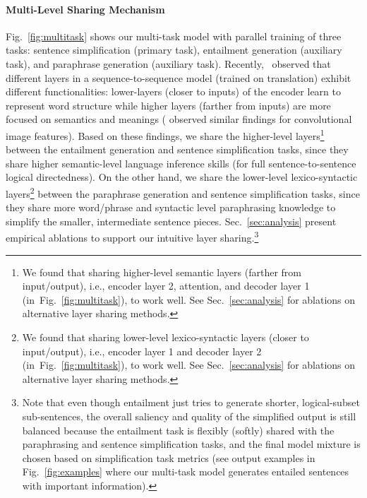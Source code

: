 \documentclass[11pt]{article}
\def\figref#1{Fig.~\ref{#1}}
\begin{document}
\paragraph{Multi-Level Sharing Mechanism} Fig.~\ref{fig:multitask} shows our multi-task model with parallel training of three tasks: sentence simplification (primary task), entailment generation (auxiliary task), and paraphrase generation (auxiliary task). 
Recently,~ observed that different layers in a sequence-to-sequence model (trained on translation) exhibit different functionalities: lower-layers (closer to inputs) of the encoder learn to represent word structure while higher layers (farther from inputs) are more focused on semantics and meanings ( observed similar findings for convolutional image features). Based on these findings, we share the higher-level layers\footnote{We found that sharing higher-level semantic layers (farther from input/output), i.e., encoder layer 2, attention, and decoder layer 1 (in~\figref{fig:multitask}), to work well. See Sec.~\ref{sec:analysis} for ablations on alternative layer sharing methods.} between the entailment generation and sentence simplification tasks, since they share higher semantic-level language inference skills (for full sentence-to-sentence logical directedness). On the other hand, we share the lower-level lexico-syntactic layers\footnote{We found that sharing lower-level lexico-syntactic layers (closer to input/output), i.e., encoder layer 1 and decoder layer 2 (in~\figref{fig:multitask}), to work well. See Sec.~\ref{sec:analysis} for ablations on alternative layer sharing methods.} between the paraphrase generation and sentence simplification tasks, since they share more word/phrase and syntactic level paraphrasing knowledge to simplify the smaller, intermediate sentence pieces.
Sec.~\ref{sec:analysis} present empirical ablations to support our intuitive layer sharing.\footnote{Note that even though entailment just tries to generate shorter, logical-subset sub-sentences, the overall saliency and quality of the simplified output is still balanced because the entailment task is flexibly (softly) shared with the paraphrasing and sentence simplification tasks, and the final model mixture is chosen based on simplification task metrics (see output examples in Fig.~\ref{fig:examples} where our multi-task model generates entailed sentences with important information).}
\end{document}
